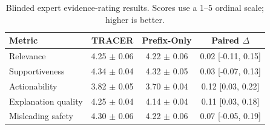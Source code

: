 \begin{table}[t]
\centering
\caption{Blinded expert evidence-rating results. Scores use a 1--5 ordinal scale; higher is better.}
\label{tab:blinded-expert-evidence-rating}
\begin{tabular}{lccc}
\toprule
Metric & TRACER & Prefix-Only & Paired $\Delta$ \\
\midrule
Relevance & 4.25 $\pm$ 0.06 & 4.22 $\pm$ 0.06 & 0.02 [-0.11, 0.15] \\
Supportiveness & 4.34 $\pm$ 0.04 & 4.32 $\pm$ 0.05 & 0.03 [-0.07, 0.13] \\
Actionability & 3.82 $\pm$ 0.05 & 3.70 $\pm$ 0.04 & 0.12 [0.03, 0.22] \\
Explanation quality & 4.25 $\pm$ 0.04 & 4.14 $\pm$ 0.04 & 0.11 [0.03, 0.18] \\
Misleading safety & 4.30 $\pm$ 0.06 & 4.22 $\pm$ 0.06 & 0.07 [-0.05, 0.19] \\
\bottomrule
\end{tabular}
\end{table}
